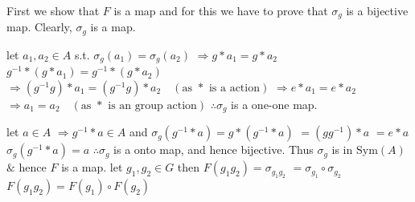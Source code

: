 First we show that $F$ is a map and for this we have to prove that $\sigma_g$ is a bijective map.
Clearly, $\sigma_g$ is a map.

let $a_1, a_2 \in A$ s.t.
$\sigma_g(a_1) = \sigma_g(a_2)$
$\Rightarrow g * a_1 = g * a_2$
$g^{-1} * (g * a_1) = g^{-1} * (g * a_2)$
$\Rightarrow (g^{-1} g) * a_1 = (g^{-1} g) * a_2 \quad (\text{as } * \text{ is a action})$
$\Rightarrow e * a_1 = e * a_2$
$\Rightarrow a_1 = a_2 \quad (\text{as } * \text{ is an group action})$
$\therefore \sigma_g$ is a one-one map.

let $a \in A$
$\Rightarrow g^{-1} * a \in A$ and
$\sigma_g(g^{-1} * a) = g * (g^{-1} * a)$
$= (g g^{-1}) * a$
$= e * a$
$\sigma_g(g^{-1} * a) = a$
$\therefore \sigma_g$ is a onto map, and hence bijective.
Thus $\sigma_g$ is in $\text{Sym}(A)$ $\&$ hence
$F$ is a map.
let $g_1, g_2 \in G$ then
$F(g_1 g_2) = \sigma_{g_1 g_2}$
$= \sigma_{g_1} \circ \sigma_{g_2}$
$F(g_1 g_2) = F(g_1) \circ F(g_2)$
